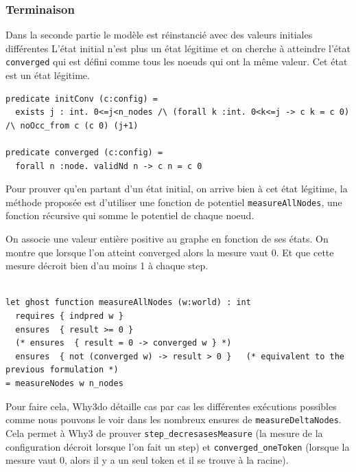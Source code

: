 \documentclass[11pt]{article}
\begin{document}
\subsubsection{Terminaison}
\label{sec:org5f73062}

Dans la seconde partie le modèle est réinstancié avec des valeurs initiales différentes 
L'état initial n'est plus un état légitime et on cherche à atteindre l'état \texttt{converged} qui 
est défini comme tous les noeuds qui ont la même valeur. Cet état est un état légitime. 

\lstset{language=why3,label= ,caption= ,captionpos=b,numbers=none}
\begin{lstlisting}
predicate initConv (c:config) =
  exists j : int. 0<=j<n_nodes /\ (forall k :int. 0<k<=j -> c k = c 0) /\ noOcc_from c (c 0) (j+1)

predicate converged (c:config) =
  forall n :node. validNd n -> c n = c 0

\end{lstlisting}


Pour prouver qu'en partant d'un état initial, on arrive bien à cet état légitime, 
la méthode proposée est d'utiliser une fonction de potentiel \texttt{measureAllNodes},
une fonction récursive qui somme le potentiel de chaque noeud.



On associe une valeur entière positive au graphe en fonction de ses états.
On montre que lorsque l'on atteint converged alors la mesure vaut 0. 
Et que cette mesure décroit bien d'au moins 1 à chaque step. 


\lstset{language=why3,label= ,caption= ,captionpos=b,numbers=none}
\begin{lstlisting}

let ghost function measureAllNodes (w:world) : int
  requires { indpred w }
  ensures  { result >= 0 }
  (* ensures  { result = 0 -> converged w } *)
  ensures  { not (converged w) -> result > 0 }   (* equivalent to the previous formulation *)
= measureNodes w n_nodes

\end{lstlisting}

Pour faire cela, Why3do détaille cas par cas les différentes exécutions possibles comme nous
pouvons le voir dans les nombreux ensures de \texttt{measureDeltaNodes}. 
Cela permet à Why3 de prouver \texttt{step\_decresasesMeasure} (la mesure de la configuration décroit lorsque l'on fait un step)
 et \texttt{converged\_oneToken} (lorsque la mesure vaut 0, alors il y a un seul token et il se trouve à la racine).  
\end{document}
